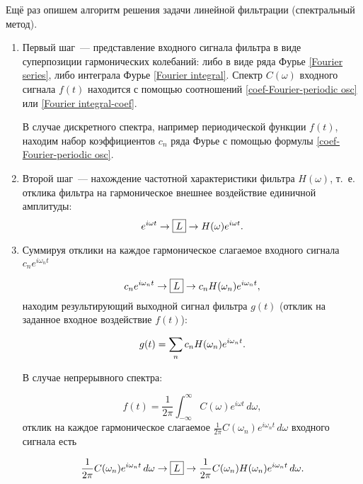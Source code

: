Ещё раз опишем алгоритм решения задачи линейной фильтрации (спектральный метод).
\begin{enumerate} 
	\item Первый шаг~--- представление входного сигнала фильтра в виде суперпозиции гармонических колебаний: либо в виде ряда Фурье \eqref{Fourier series}, либо интеграла Фурье \eqref{Fourier integral}. Спектр $C(\omega)$ входного сигнала $f(t)$ находится с помощью соотношений \eqref{coef-Fourier-periodic osc} или \eqref{Fourier integral-coef}.

В случае дискретного спектра, например периодической функции $f(t)$, находим набор коэффициентов $c_n$ ряда Фурье с
помощью формулы \eqref{coef-Fourier-periodic osc}.

	\item Второй шаг~--- нахождение частотной характеристики фильтра $H(\omega)$, т.~е. отклика фильтра на гармоническое
внешнее воздействие единичной амплитуды:
\begin{equation*}
	e^{i\omega t}\to\fbox{$L$}\to H(\omega)e^{i\omega t}.
\end{equation*}

	\item Суммируя отклики на каждое гармоническое слагаемое входного сигнала $c_n e^{i\omega_n t}$

\begin{equation*}
	c_n e^{i\omega_n t} \to\fbox{$L$}\to c_n H(\omega_n)e^{i\omega_n t},
\end{equation*}
находим результирующий выходной сигнал фильтра $g(t)$ (отклик на заданное входное воздействие $f(t)$):

\begin{equation}
	\eqmark{output signal}
	g(t)=\sum_n c_n H(\omega_n)e^{i\omega_n t}.
\end{equation}

В случае непрерывного спектра:

\begin{equation*}
	f(t)=\frac{1}{2\pi}\int_{-\infty}^\infty C(\omega)e^{i\omega t}\,d\omega,
\end{equation*}
отклик на каждое гармоническое слагаемое $\frac{1}{2\pi} C(\omega_n)e^{i\omega_n t}\,d\omega$ входного сигнала есть

\begin{equation*}
	\frac{1}{2\pi}C(\omega_n)e^{i\omega_n t}\,d\omega
\to\fbox{$L$}\to\frac{1}{2\pi}C(\omega_n)H(\omega_n)e^{i\omega_nt}\,d\omega.
\end{equation*}


\end{enumerate}
